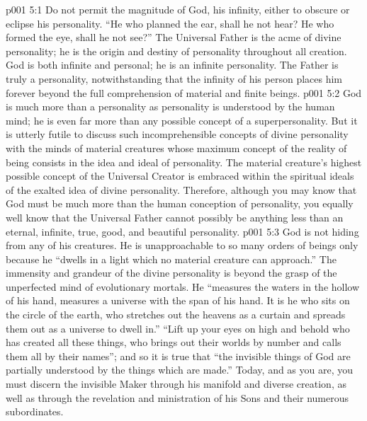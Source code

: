 \vs p001 5:1 Do not permit the magnitude of God, his infinity, either to obscure or eclipse his personality. “He who planned the ear, shall he not hear? He who formed the eye, shall he not see?” The Universal Father is the acme of divine personality; he is the origin and destiny of personality throughout all creation. God is both infinite and personal; he is an infinite personality. The Father is truly a personality, notwithstanding that the infinity of his person places him forever beyond the full comprehension of material and finite beings.
\vs p001 5:2 God is much more than a personality as personality is understood by the human mind; he is even far more than any possible concept of a superpersonality. But it is utterly futile to discuss such incomprehensible concepts of divine personality with the minds of material creatures whose maximum concept of the reality of being consists in the idea and ideal of personality. The material creature’s highest possible concept of the Universal Creator is embraced within the spiritual ideals of the exalted idea of divine personality. Therefore, although you may know that God must be much more than the human conception of personality, you equally well know that the Universal Father cannot possibly be anything less than an eternal, infinite, true, good, and beautiful personality.
\vs p001 5:3 God is not hiding from any of his creatures. He is unapproachable to so many orders of beings only because he “dwells in a light which no material creature can approach.” The immensity and grandeur of the divine personality is beyond the grasp of the unperfected mind of evolutionary mortals. He “measures the waters in the hollow of his hand, measures a universe with the span of his hand. It is he who sits on the circle of the earth, who stretches out the heavens as a curtain and spreads them out as a universe to dwell in.” “Lift up your eyes on high and behold who has created all these things, who brings out their worlds by number and calls them all by their names”; and so it is true that “the invisible things of God are partially understood by the things which are made.” Today, and as you are, you must discern the invisible Maker through his manifold and diverse creation, as well as through the revelation and ministration of his Sons and their numerous subordinates.
